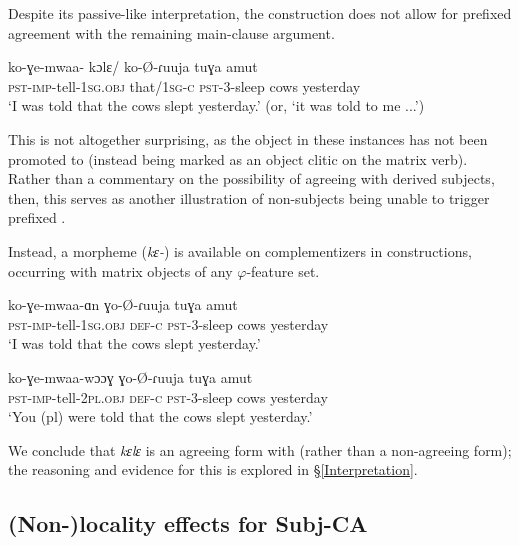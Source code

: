 \documentclass[output=paper,newtxmath,modfonts,nonflat,hidelinks]{langsci/langscibook}
\begin{document}
Despite its passive-like interpretation, the  construction does not allow for prefixed agreement with the remaining main-clause argument.

\ea
\gll ko-ɣe-mwaa- kɔlɛ/ ko-\O-ɾuuja tuɣa amut \\
\textsc{pst-imp}-tell-1\textsc{sg}.\textsc{obj} that/1\textsc{sg-c} \textsc{pst}-3-sleep cows yesterday \\ 
\glt `I was told that the cows slept yesterday.' (or, `it was told to me ...')
\z

\noindent This is not altogether surprising, as the object in these instances has not been promoted to  (instead being marked as an object clitic on the matrix verb). Rather than a commentary on the possibility of agreeing with derived subjects, then, this serves as another illustration of non-subjects being unable to trigger prefixed . 

Instead, a  morpheme (\textit{kɛ-}) is available on complementizers in  constructions, occurring with  matrix objects of any $\varphi$-feature set. 

\ea \label{keleExamples}
\begin{xlist}

\ex 
\gll ko-ɣe-mwaa-ɑn  ɣo-\O-ɾuuja tuɣa amut \\
\textsc{pst-imp}-tell-1\textsc{sg}.\textsc{obj} \textsc{def}-\textsc{c} \textsc{pst}-3-sleep cows yesterday \\
\glt `I was told that the cows slept yesterday.'
	
\ex 
\gll ko-ɣe-mwaa-wɔɔɣ  ɣo-\O-ɾuuja tuɣa amut \\
\textsc{pst}-\textsc{imp}-tell-2\textsc{pl}.\textsc{obj} \textsc{def}-\textsc{c} \textsc{pst}-3-sleep cows yesterday \\
\glt `You (pl) were told that the cows slept yesterday.'

\end{xlist}
\z

\noindent We conclude that \textit{kɛlɛ} is an agreeing form with  (rather than a non-agreeing form); the reasoning and evidence for this is explored in  \S \ref{Interpretation}.

\subsection{(Non-)locality effects for Subj-CA} \label{Non Locality}
\end{document}
